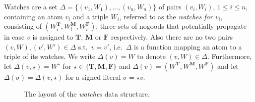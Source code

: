 \documentclass{vutinfth} %
\theoremstyle{example}
\theoremstyle{definition}
\theoremstyle{theorem}
\theoremstyle{lemma}
\theoremstyle{corollary}
\newcommand{\bT}{\mathbf{T}}
\newcommand{\bM}{\mathbf{M}}
\newcommand{\bF}{\mathbf{F}}
\newcommand{\thrice}{{\{\bT, \bM, \bF \}}}
\begin{document}

Watches are a set $\Delta = \{ (v_1, W_1), \ldots, (v_n, W_n) \}$ of pairs $(v_i, W_i)$, $1 \leq i \leq n$, containing an atom $v_i$ and a triple $W_i$, referred to as the \emph{watches for $v_i$}, consisting of $(W_i^\mathbf{T}, W_i^\mathbf{M}, W_i^\mathbf{F})$, three sets of nogoods that potentially propagate in case $v$ is assigned to $\mathbf{T}$, $\mathbf{M}$ or $\mathbf{F}$ respectively. Also there are no two pairs $(v, W), (v', W') \in \Delta$ s.t.~$v = v'$, i.e.~$\Delta$ is a function mapping an atom to a triple of its watches. We write $\Delta(v) = W$ to denote $(v, W) \in \Delta$. Furthermore, let $\Delta(v, \star) = W^\star$ for $\star \in \thrice$ and $\Delta(v) = (W^\mathbf{T}, W^\mathbf{M}, W^\mathbf{F})$ and let $\Delta(\sigma) = \Delta(v, \star)$ for a signed literal $\sigma = \star v$.

\begin{figure}[h]
  \centering
{}
  \caption{The layout of the \emph{watches} data structure.}
  \label{fig:watches} %
\end{figure}
\end{document}
